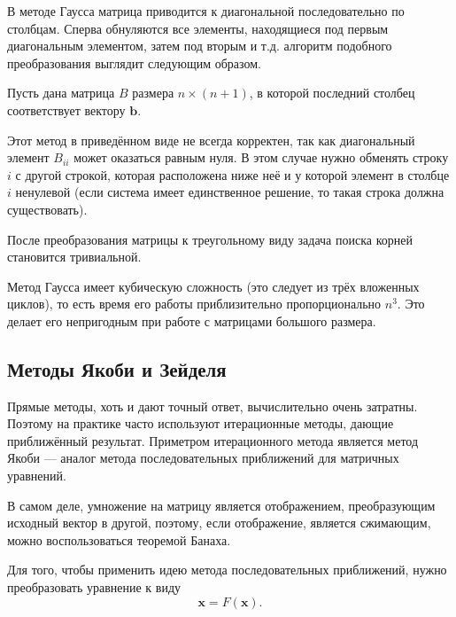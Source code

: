 В методе Гаусса матрица приводится к диагональной последовательно
по столбцам. Сперва обнуляются все элементы, находящиеся под первым
диагональным элементом, затем под вторым и т.д. алгоритм подобного
преобразования выглядит следующим образом.

Пусть дана матрица $B$ размера $n\times(n+1)$, в которой последний
столбец соответствует вектору $\mathbf{b}$.


Этот метод в приведённом виде не всегда корректен, так как диагональный
элемент $B_{ii}$ может оказаться равным нуля. В этом случае нужно
обменять строку $i$ с другой строкой, которая расположена ниже неё
и у которой элемент в столбце $i$ ненулевой (если система имеет единственное
решение, то такая строка должна существовать).

После преобразования матрицы к треугольному виду задача поиска корней
становится тривиальной.

Метод Гаусса имеет кубическую сложность (это следует из трёх вложенных
циклов), то есть время его работы приблизительно пропорционально $n^{3}$.
Это делает его непригодным при работе с матрицами большого размера.


\subsection{Методы Якоби и Зейделя}

Прямые методы, хоть и дают точный ответ, вычислительно очень затратны.
Поэтому на практике часто используют итерационные методы, дающие приближённый
результат. Приметром итерационного метода является метод Якоби — аналог
метода последовательных приближений для матричных уравнений.

В самом деле, умножение на матрицу является отображением, преобразующим
исходный вектор в другой, поэтому, если отображение, является сжимающим,
можно воспользоваться теоремой Банаха.

Для того, чтобы применить идею метода последовательных приближений,
нужно преобразовать уравнение к виду
\[
\mathbf{x}=F(\mathbf{x}).
\]


